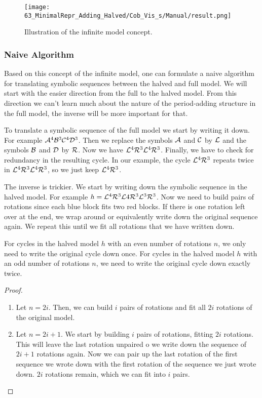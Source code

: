 \begin{figure}
	\centering
	\texttt{[image: 63\_MinimalRepr\_Adding\_Halved/Cob\_Vis\_s/Manual/result.png]}
	\caption{Illustration of the infinite model concept.}
	\label{fig:minrep.infinite.model.concept}
\end{figure}

\subsubsection{Naive Algorithm}

Based on this concept of the infinite model, one can formulate a naive algorithm for translating symbolic sequences between the halved and full model.
We will start with the easier direction from the full to the halved model.
From this direction we can't learn much about the nature of the period-adding structure in the full model, the inverse will be more important for that.

To translate a symbolic sequence of the full model we start by writing it down.
For example $\mathcal{A}^4\mathcal{B}^3\mathcal{C}^4\mathcal{D}^3$.
Then we replace the symbols $\mathcal{A}$ and $\mathcal{C}$ by $\mathcal{L}$ and the symbols $\mathcal{B}$ and $\mathcal{D}$ by $\mathcal{R}$.
Now we have $\mathcal{L}^4\mathcal{R}^3\mathcal{L}^4\mathcal{R}^3$.
Finally, we have to check for redundancy in the resulting cycle.
In our example, the cycle $\mathcal{L}^4\mathcal{R}^3$ repeats twice in $\mathcal{L}^4\mathcal{R}^3\mathcal{L}^4\mathcal{R}^3$, so we just keep $\mathcal{L}^4\mathcal{R}^3$.

The inverse is trickier.
We start by writing down the symbolic sequence in the halved model.
For example $h = \mathcal{L}^4\mathcal{R}^3\mathcal{L}4\mathcal{R}^3\mathcal{L}^3\mathcal{R}^3$.
Now we need to build pairs of rotations since each blue block fits two red blocks.
If there is one rotation left over at the end, we wrap around or equivalently write down the original sequence again.
We repeat this until we fit all rotations that we have written down.

\begin{lemma}
	\label{lemma:writing.down}
	For cycles in the halved model $h$ with an even number of rotations $n$, we only need to write the original cycle down once.
	For cycles in the halved model $h$ with an odd number of rotations $n$, we need to write the original cycle down exactly twice.
\end{lemma}

\begin{proof}
	\begin{enumerate}
		\item Let $n = 2i$. Then, we can build $i$ pairs of rotations and fit all $2i$ rotations of the original model.
		\item Let $n = 2i + 1$. We start by building $i$ pairs of rotations, fitting $2i$ rotations.
		      This will leave the last rotation unpaired o we write down the sequence of $2i + 1$ rotations again.
		      Now we can pair up the last rotation of the first sequence we wrote down with the first rotation of the sequence we just wrote down.
		      $2i$ rotations remain, which we can fit into $i$ pairs.
	\end{enumerate}
\end{proof}

